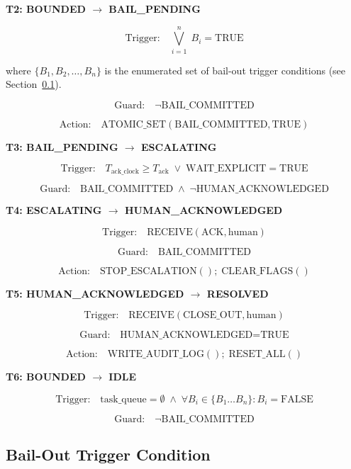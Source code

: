 \bigskip

\noindent\textbf{T2: BOUNDED $\rightarrow$ BAIL\_PENDING}

\[
\text{Trigger:} \quad \bigvee_{i=1}^{n} \; B_i = \text{TRUE}
\]

where $\{B_1, B_2, \ldots, B_n\}$ is the enumerated set of bail-out trigger conditions (see Section~\ref{sec:triggers}).

\[
\text{Guard:} \quad \neg \text{BAIL\_COMMITTED}
\]

\[
\text{Action:} \quad \text{ATOMIC\_SET}(\text{BAIL\_COMMITTED}, \text{TRUE})
\]

\bigskip

\noindent\textbf{T3: BAIL\_PENDING $\rightarrow$ ESCALATING}

\[
\text{Trigger:} \quad T_{\text{ack\_clock}} \geq T_{\text{ack}} \; \lor \; \text{WAIT\_EXPLICIT} = \text{TRUE}
\]

\[
\text{Guard:} \quad \text{BAIL\_COMMITTED} \;\land\; \neg \text{HUMAN\_ACKNOWLEDGED}
\]

\bigskip

\noindent\textbf{T4: ESCALATING $\rightarrow$ HUMAN\_ACKNOWLEDGED}

\[
\text{Trigger:} \quad \text{RECEIVE}(\text{ACK}, \text{human})
\]

\[
\text{Guard:} \quad \text{BAIL\_COMMITTED}
\]

\[
\text{Action:} \quad \text{STOP\_ESCALATION}(); \; \text{CLEAR\_FLAGS}()
\]

\bigskip

\noindent\textbf{T5: HUMAN\_ACKNOWLEDGED $\rightarrow$ RESOLVED}

\[
\text{Trigger:} \quad \text{RECEIVE}(\text{CLOSE\_OUT}, \text{human})
\]

\[
\text{Guard:} \quad \text{HUMAN\_ACKNOWLEDGED} = \text{TRUE}
\]

\[
\text{Action:} \quad \text{WRITE\_AUDIT\_LOG}(); \; \text{RESET\_ALL}()
\]

\bigskip

\noindent\textbf{T6: BOUNDED $\rightarrow$ IDLE}

\[
\text{Trigger:} \quad \text{task\_queue} = \emptyset \; \land \; \forall B_i \in \{B_1 \ldots B_n\}: B_i = \text{FALSE}
\]

\[
\text{Guard:} \quad \neg \text{BAIL\_COMMITTED}
\]

\bigskip

\subsection{Bail-Out Trigger Condition}
\label{sec:triggers}

